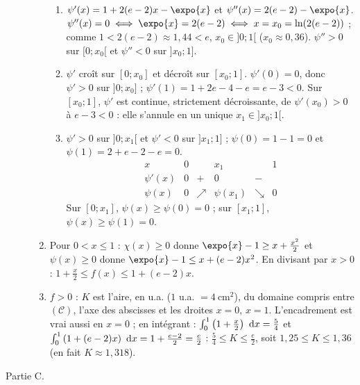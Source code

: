 \begin{corrige}
\begin{sol}
\begin{description}
\begin{enumerate}
\begin{enumerate}
            \item $\psi'(x) = 1 + 2(e - 2)x - \expo{x}$ et $\psi''(x) = 2(e - 2) - \expo{x}$.
                  $\psi''(x) = 0 \iff \expo{x} = 2(e - 2) \iff x = x_0 = \ln(2(e - 2))$ ; comme $1 < 2(e - 2) \approx 1{,}44 < e$,
                  $x_0 \in ]0 ; 1[$ ($x_0 \approx 0{,}36$). $\psi'' > 0$ sur $[0 ; x_0[$ et $\psi'' < 0$ sur $]x_0 ; 1]$.
            \item $\psi'$ cro\^it sur $[0 ; x_0]$ et d\'ecro\^it sur $[x_0 ; 1]$. $\psi'(0) = 0$, donc $\psi' > 0$ sur $]0 ; x_0]$ ;
                  $\psi'(1) = 1 + 2e - 4 - e = e - 3 < 0$. Sur $[x_0 ; 1]$, $\psi'$ est continue, strictement d\'ecroissante, de
                  $\psi'(x_0) > 0$ \`a $e - 3 < 0$ : elle s'annule en un unique $x_1 \in ]x_0 ; 1[$.
            \item $\psi' > 0$ sur $]0 ; x_1[$ et $\psi' < 0$ sur $]x_1 ; 1]$ ; $\psi(0) = 1 - 1 = 0$ et $\psi(1) = 2 + e - 2 - e = 0$.
                  \[
                  \begin{array}{c|ccccc}
                  x & 0 & & x_1 & & 1 \\ \hline
                  \psi'(x) & 0 & + & 0 & - & \\ \hline
                  \psi(x) & 0 & \nearrow & \psi(x_1) & \searrow & 0
                  \end{array}
                  \]
                  Sur $[0 ; x_1]$, $\psi(x) \geq \psi(0) = 0$ ; sur $[x_1 ; 1]$, $\psi(x) \geq \psi(1) = 0$.
            \end{enumerate}
      \item Pour $0 < x \leq 1$ : $\chi(x) \geq 0$ donne $\expo{x} - 1 \geq x + \frac{x^2}{2}$ et $\psi(x) \geq 0$ donne
            $\expo{x} - 1 \leq x + (e - 2)x^2$. En divisant par $x > 0$ : $1 + \frac{x}{2} \leq f(x) \leq 1 + (e - 2)x$.
      \item $f > 0$ : $K$ est l'aire, en u.a. ($1$ u.a. $= 4~\text{cm}^2$), du domaine compris entre $(\mathscr{C})$, l'axe des abscisses
            et les droites $x = 0$, $x = 1$. L'encadrement est vrai aussi en $x = 0$ ; en int\'egrant :
            $\int_0^1 \left( 1 + \frac{x}{2} \right)~\mathrm{d}x = \frac{5}{4}$ et $\int_0^1 \left( 1 + (e - 2)x \right)~\mathrm{d}x = 1 + \frac{e - 2}{2} = \frac{e}{2}$ :
            $\boxed{\frac{5}{4} \leq K \leq \frac{e}{2}}$, soit $1{,}25 \leq K \leq 1{,}36$ (en fait $K \approx 1{,}318$).
      \end{enumerate}
\item[Partie C.] \begin{enumerate}

\end{enumerate}
\end{description}
\end{sol}
\end{corrige}
